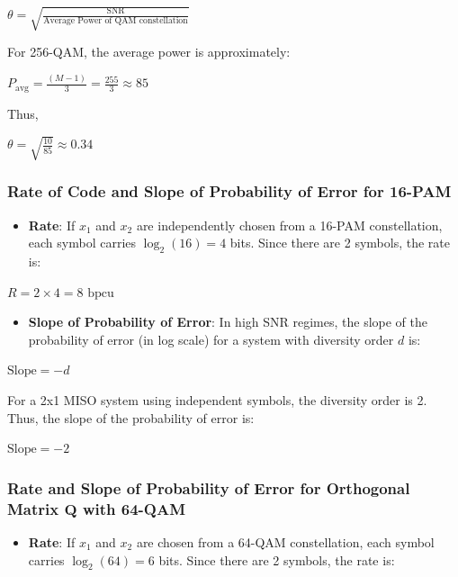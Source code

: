 \documentclass[11pt]{article}
\providecommand{\tightlist}{%
      \setlength{\itemsep}{0pt}\setlength{\parskip}{0pt}}
\begin{document}
\(\theta = \sqrt{\frac{\text{SNR}}{\text{Average Power of QAM constellation}}}\)

For 256-QAM, the average power is approximately:

\(P_{\text{avg}} = \frac{(M-1)}{3} = \frac{255}{3} \approx 85\)

Thus,

\(\theta = \sqrt{\frac{10}{85}} \approx 0.34\)

\subsubsection{Rate of Code and Slope of Probability of Error for
16-PAM}\label{rate-of-code-and-slope-of-probability-of-error-for-16-pam}

\begin{itemize}
\tightlist
\item
  \textbf{Rate}: If \(x_1\) and \(x_2\) are independently chosen from a
  16-PAM constellation, each symbol carries \(\log_2(16) = 4\) bits.
  Since there are 2 symbols, the rate is:
\end{itemize}

\(R = 2 \times 4 = 8 \text{ bpcu}\)

\begin{itemize}
\tightlist
\item
  \textbf{Slope of Probability of Error}: In high SNR regimes, the slope
  of the probability of error (in log scale) for a system with diversity
  order \(d\) is:
\end{itemize}

\(\text{Slope} = -d\)

For a 2x1 MISO system using independent symbols, the diversity order is
2. Thus, the slope of the probability of error is:

\(\text{Slope} = -2\)

\subsubsection{\texorpdfstring{Rate and Slope of Probability of Error
for Orthogonal Matrix \(\mathbf{Q}\) with
64-QAM}{Rate and Slope of Probability of Error for Orthogonal Matrix \textbackslash mathbf\{Q\} with 64-QAM}}\label{rate-and-slope-of-probability-of-error-for-orthogonal-matrix-mathbfq-with-64-qam}

\begin{itemize}
\tightlist
\item
  \textbf{Rate}: If \(x_1\) and \(x_2\) are chosen from a 64-QAM
  constellation, each symbol carries \(\log_2(64) = 6\) bits. Since
  there are 2 symbols, the rate is:
\end{itemize}
\end{document}
